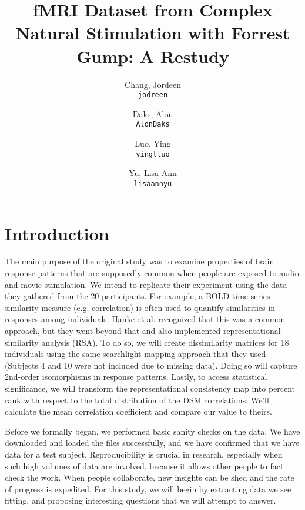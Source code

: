 \documentclass[11pt]{article}
\title{
fMRI Dataset from Complex Natural Stimulation with Forrest Gump: A Restudy
}
\author{
  Chang, Jordeen\\
  \texttt{jodreen}
  \and
  Daks, Alon\\
  \texttt{AlonDaks}
  \and
  Luo, Ying\\
  \texttt{yingtluo}
  \and
  Yu, Lisa Ann\\
  \texttt{lisaannyu}
}
\begin{document}
\maketitle


\section{Introduction}

The main purpose of the original study was to examine properties of brain
response patterns that are supposedly common when people are exposed to audio
and movie stimulation. We intend to replicate their experiment using the data
they gathered from the 20 participants. For example, a BOLD time-series
similarity measure (e.g. correlation) is often used to quantify similarities
in responses among individuals. Hanke et al. recognized that this was a common
approach, but they went beyond that and also implemented representational
similarity analysis (RSA). To do so, we will create dissimilarity matrices for
18 individuals using the same searchlight mapping approach that they used
(Subjects 4 and 10 were not included due to missing data). Doing so will
capture 2nd-order isomorphisms in response patterns. Lastly, to access
statistical significance, we will transform the representational consistency
map into percent rank with respect to the total distribution of the DSM
correlations. We'll calculate the mean correlation coefficient and compare our
value to theirs.

Before we formally began, we performed basic sanity checks on the data. We
have downloaded and loaded the files successfully, and we have confirmed that
we have data for a test subject. Reproducibility is crucial in research,
especially when such high volumes of data are involved, because it allows
other people to fact check the work. When people collaborate, new insights can
be shed and the rate of progress is expedited. For this study, we will begin
by extracting data we see fitting, and proposing interesting questions that we
will attempt to answer.
\end{document}
